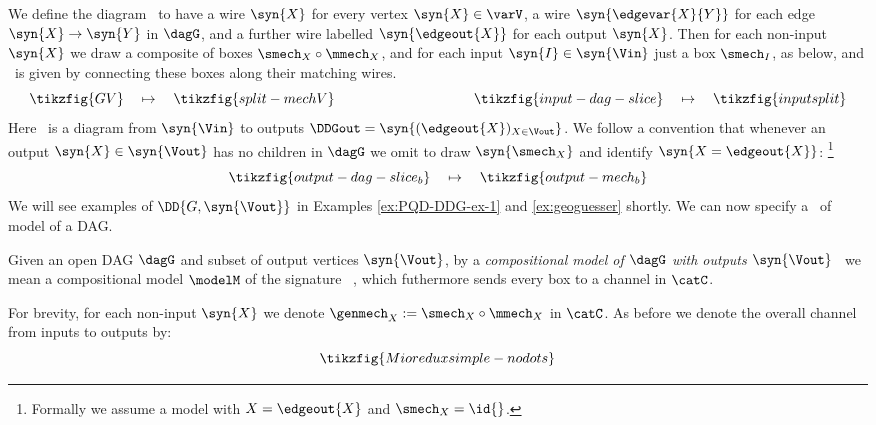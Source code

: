 \documentclass{article}
\begin{document}
We define the diagram \ to have a wire $\syn{X}$ for every vertex $\syn{X} \in \varV$, a wire $\syn{\edgevar{X}{Y}}$ for each edge $\syn{X} \to \syn{Y}$ in $\dagG$, and a further wire labelled $\syn{\edgeout{X}}$ for each output $\syn{X}$. Then for   
each non-input $\syn{X}$ we draw a composite of boxes $\smech_X \circ \mmech_X$, and for each input $\syn{I} \in \syn{\Vin}$ just a box $\smech_I$, as below, and ~is given by connecting these boxes along their matching wires. 
\[
\tikzfig{GV} 
\quad 
\mapsto 
\quad 
\tikzfig{split-mechV}
\qquad \qquad \qquad \qquad \qquad 
\tikzfig{input-dag-slice} 
\quad
\mapsto
\quad
\tikzfig{inputsplit}
\]
Here \ is a diagram from $\syn{\Vin}$ to outputs $\DDGout = \syn{(\edgeout{X})_{X \in \Vout}}$. We follow a convention that whenever an output $\syn{X} \in \syn{\Vout}$ has no children in $\dagG$ we omit to draw $\syn{\smech_X}$ and identify $\syn{X = \edgeout{X}}$: \footnote{Formally we assume a model with $X=\edgeout{X}$ and $\smech_X = \id{}$.} 
\[
\tikzfig{output-dag-slice_b}
\quad
\mapsto
\quad
\tikzfig{output-mech_b}
\]
We will see examples of $\DD{G,\syn{\Vout}}$ in Examples \ref{ex:PQD-DDG-ex-1} and \ref{ex:geoguesser} shortly. We can now specify a \ of model of a DAG. 

\begin{definition} \label{Def:comp-model-more-general}
Given an open DAG $\dagG$ and subset of output vertices $\syn{\Vout}$, by a \emph{compositional model of $\dagG$ with outputs $\syn{\Vout}$} \ we mean a compositional model $\modelM$ of the signature \ , which futhermore sends every box to a channel in $\catC$. 
\end{definition}

For brevity, for each non-input $\syn{X}$ we denote $\genmech_X := \smech_X \circ \mmech_X$ in $\catC$. As before we denote the overall channel from inputs to outputs by:  
\[
\tikzfig{Mioreduxsimple-nodots}
\]
\end{document}
